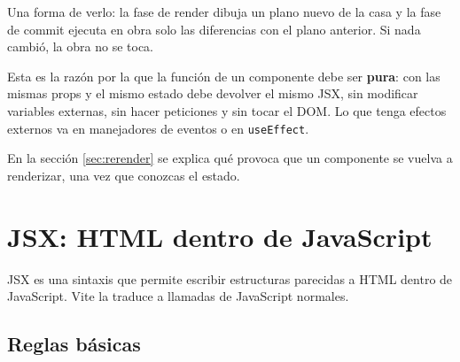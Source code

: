 \documentclass[11pt,a4paper]{article}
\newcommand{\cmd}[1]{\texttt{\color{reactdark}#1}}
\begin{document}
\begin{center}
\end{center}

Una forma de verlo: la fase de render dibuja un plano nuevo de la casa y la fase de commit ejecuta en obra solo las diferencias con el plano anterior. Si nada cambió, la obra no se toca.

Esta es la razón por la que la función de un componente debe ser \textbf{pura}: con las mismas props y el mismo estado debe devolver el mismo JSX, sin modificar variables externas, sin hacer peticiones y sin tocar el DOM. Lo que tenga efectos externos va en manejadores de eventos o en \cmd{useEffect}.

\begin{nota}
En la sección \ref{sec:rerender} se explica qué provoca que un componente se vuelva a renderizar, una vez que conozcas el estado.
\end{nota}

\section{JSX: HTML dentro de JavaScript}\label{sec:jsx}

JSX es una sintaxis que permite escribir estructuras parecidas a HTML dentro de JavaScript. Vite la traduce a llamadas de JavaScript normales.

\subsection{Reglas básicas}
\end{document}
